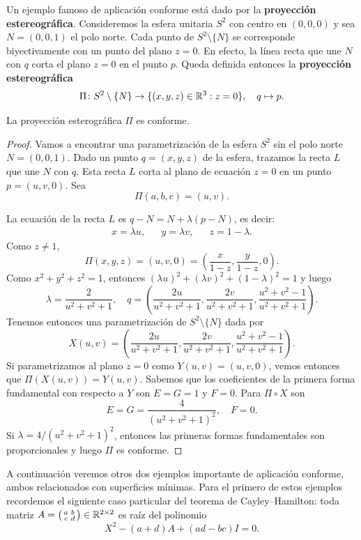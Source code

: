 Un ejemplo famoso de aplicación conforme está dado por la \textbf{proyección
estereográfica}. Consideremos la esfera unitaria $S^2$ con centro en $(0,0,0)$
y sea $N=(0,0,1)$ el polo norte.  Cada punto de $S^2\setminus\{N\}$ se
corresponde biyectivamente con un punto del plano $z=0$. En efecto, la línea
recta que une $N$ con $q$ corta el plano $z=0$ en el punto $p$. Queda definida
entonces la \textbf{proyección estereográfica}
\[
	\Pi\colon S^2\setminus\{N\}\to\{(x,y,z)\in\mathbb{R}^3:z=0\},
	\quad
	q\mapsto p.
\]

\begin{theorem}
	\label{thm:estereografica}
	La proyección esterográfica $\Pi$ es conforme.
\end{theorem}

\begin{proof}
	Vamos a encontrar una parametrización de la esfera $S^2$ sin el polo norte
	$N=(0,0,1)$.  Dado un punto $q=(x,y,z)$ de la esfera, trazamos la recta $L$
	que une $N$ con $q$. Esta recta $L$ corta al plano de ecuación $z=0$ en un
	punto $p=(u,v,0)$. Sea
	\[
		\Pi(a,b,c)=(u,v).
	\]
	
	La ecuación de la recta $L$ es $q-N=N+\lambda(p-N)$, es decir:
	\begin{align*}
		x=\lambda u,&&
		y=\lambda v,&&
		z=1-\lambda.
	\end{align*}
	Como $z\ne 1$,
	\[
		\Pi(x,y,z)=(u,v,0)=\left(\frac{x}{1-z},\frac{y}{1-z},0\right).
	\]
	Como $x^2+y^2+z^2=1$, entonces
	$(\lambda u)^2+(\lambda v)^2+(1-\lambda)^2=1$ 
	y luego
	\[
		\lambda=\frac{2}{u^2+v^2+1},\quad
		q=\left(\frac{2u}{u^2+v^2+1},\frac{2v}{u^2+v^2+1},\frac{u^2+v^2-1}{u^2+v^2+1}\right).
	\]
	Tenemos entonces una parametrización de $S^2\setminus\{N\}$ dada por 
	\[
		X(u,v)=
		\left(\frac{2u}{u^2+v^2+1},\frac{2v}{u^2+v^2+1},\frac{u^2+v^2-1}{u^2+v^2+1}\right).
	\]
	Si parametrizamos al plano $z=0$ como $Y(u,v)=(u,v,0)$, vemos entonces que
	$\Pi(X(u,v))=Y(u,v)$. Sabemos que los coeficientes de la primera forma
	fundamental con respecto a $Y$ son $E=G=1$ y $F=0$. Para $\Pi\circ X$ son 
	\[
		E=G=\frac{4}{(u^2+v^2+1)^2},\quad 
		F=0.
	\]
	Si $\lambda=4/(u^2+v^2+1)^2$, entonces las primeras formas fundamentales
	son proporcionales y luego $\Pi$ es conforme. 
\end{proof}

A continuación veremos otros dos ejemplos importante de aplicación conforme, ambos
relacionados con superficies mínimas. Para el primero de estos ejemplos
recordemos el siguiente caso particular del teorema de Cayley--Hamilton: toda
matriz
$A=\left(\begin{smallmatrix}a&b\\c&d\end{smallmatrix}\right)\in\mathbb{R}^{2\times 2}$
es raíz del polinomio \[X^2-(a+d)A+(ad-bc)I=0.\]

